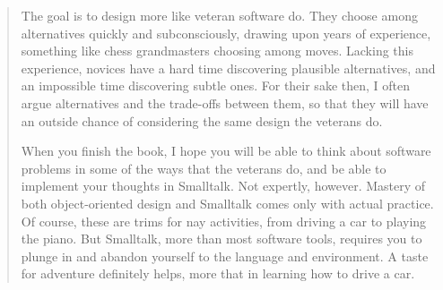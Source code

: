 \begin{quote}
        The goal is to design more like veteran software do. They choose among
    alternatives quickly and subconsciously, drawing upon years of experience,
    something like chess grandmasters choosing among moves. Lacking this experience,
    novices have a hard time discovering plausible alternatives, and an impossible
    time discovering subtle ones. For their sake then, I often argue alternatives
    and the trade-offs between them, so that they will have an outside chance of
    considering the same design the veterans do.

        When you finish the book, I hope you will be able to think about software
    problems in some of the ways that the veterans do, and be able to implement your
    thoughts in Smalltalk. Not expertly, however. Mastery of both object-oriented
    design and Smalltalk comes only with actual practice. Of course, these are trims
    for nay activities, from driving a car to playing the piano. But Smalltalk,
    more than most software tools, requires you to plunge in and abandon yourself
    to the language and environment. A taste for adventure definitely helps, more
    that in learning how to drive a car.
\end{quote}
